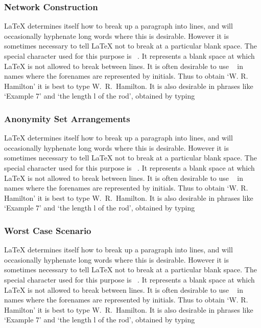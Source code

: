 \documentclass[12pt]{report}
\begin{document}
\subsubsection{Network Construction}

LaTeX determines itself how to break up a paragraph into lines, and will occasionally hyphenate long words where this is desirable. However it is sometimes necessary to tell LaTeX not to break at a particular blank space. The special character used for this purpose is ~. It represents a blank space at which LaTeX is not allowed to break between lines. It is often desirable to use ~ in names where the forenames are represented by initials. Thus to obtain `W. R. Hamilton' it is best to type W.~R.~Hamilton. It is also desirable in phrases like `Example 7' and `the length l of the rod', obtained by typing



\subsubsection{Anonymity Set Arrangements}

LaTeX determines itself how to break up a paragraph into lines, and will occasionally hyphenate long words where this is desirable. However it is sometimes necessary to tell LaTeX not to break at a particular blank space. The special character used for this purpose is ~. It represents a blank space at which LaTeX is not allowed to break between lines. It is often desirable to use ~ in names where the forenames are represented by initials. Thus to obtain `W. R. Hamilton' it is best to type W.~R.~Hamilton. It is also desirable in phrases like `Example 7' and `the length l of the rod', obtained by typing



\subsubsection{Worst Case Scenario}

LaTeX determines itself how to break up a paragraph into lines, and will occasionally hyphenate long words where this is desirable. However it is sometimes necessary to tell LaTeX not to break at a particular blank space. The special character used for this purpose is ~. It represents a blank space at which LaTeX is not allowed to break between lines. It is often desirable to use ~ in names where the forenames are represented by initials. Thus to obtain `W. R. Hamilton' it is best to type W.~R.~Hamilton. It is also desirable in phrases like `Example 7' and `the length l of the rod', obtained by typing
\end{document}
